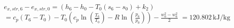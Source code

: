 \( e_{x,str,6} - e_{x,str,0} = (h_6 - h_0 - T_0(s_6 - s_0) + k_2) \)  
\( = c_p(T_6 - T_0) - T_0(c_p \ln \left(\frac{T_6}{T_0}\right) - R \ln \left(\frac{p_6}{p_0}\right)) - \frac{w_0^2 - w_6^2}{2} \)  
\( = 120.802 \, \text{kJ/kg} \)